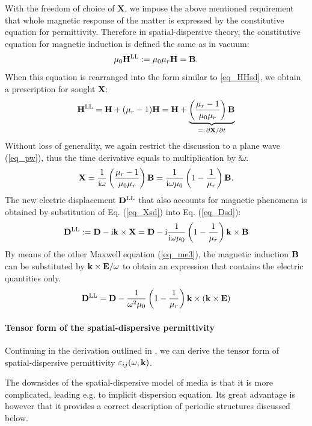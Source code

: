 With the freedom of choice of $\mathbf{X}$, we impose the above mentioned requirement that whole magnetic response of the matter is expressed by the constitutive equation for permittivity. Therefore in spatial-dispersive theory, the constitutive equation %
for magnetic induction is defined the same as in vacuum:
\begin{equation} \mu_0 {\mathbf{H}^\text{LL}} := \mu_0 \mu_r \mathbf{H} = \mathbf{B}. \label{eq_mu_sd}\end{equation}
When this equation is rearranged into the form similar to \ref{eq_HHsd}, we obtain a prescription for sought $\mathbf{X}$: 
$$ {\mathbf{H}^\text{LL}} = \mathbf{H} + (\mu_r -1)\mathbf{H} = \mathbf{H} + \underbrace{\left(\frac{\mu_r-1}{\mu_0\mu_r}\right)\mathbf{B}}_{=:\,\partial\mathbf{X}/\partial t}$$
Without loss of generality, we again restrict the discussion to a plane wave (\ref{eq_pw}), thus the time derivative equals to multiplication by $\ii\omega$.
\begin{equation} \mathbf{X} = \frac{1}{{\mathrm i}\omega}\left(\frac{\mu_r-1}{\mu_0\mu_r}\right)\mathbf{B} = \frac{1}{{\mathrm i}\omega\mu_0}\left(1 - \frac{1}{\mu_r}\right)\mathbf{B}. \label{eq_Xsd}\end{equation}
The new electric displacement ${\mathbf{D}^\text{LL}}$ that also accounts for magnetic phenomena is obtained by substitution of Eq. (\ref{eq_Xsd}) into Eq. (\ref{eq_Dsd}):
\begin{equation} {\mathbf{D}^\text{LL}} := \mathbf{D} - {\mathrm i}{\mathbf{k}}\times \mathbf{X} =  \mathbf{D} - {\mathrm i}  \frac{1}{{\mathrm i}\omega\mu_0}\left(1 - \frac{1}{\mu_r}\right) {\mathbf{k}}\times \mathbf{B}  \label{eq_Dsd2}\end{equation}
By means of the other Maxwell equation (\ref{eq_me3}), the magnetic induction $\mathbf{B}$ can be substituted by ${\mathbf{k}}\times\mathbf{E} / \omega$ to obtain an expression that contains the electric quantities only.
\begin{equation} {\mathbf{D}^\text{LL}} = \mathbf{D} - \frac{1}{\omega^2 \mu_0}\left(1 - \frac{1}{\mu_r}\right) {\mathbf{k}}\times({\mathbf{k}}\times \mathbf{E})  \label{eq_Dsd3}\end{equation}
\paragraph{Tensor form of the spatial-dispersive permittivity}%
Continuing in the derivation outlined in \cite{landau1984electrodynamics, krowne2007book_agran, agranovich2006spatial}, we can derive the tensor form of spatial-dispersive permittivity $\varepsilon_{ij}(\omega,{\mathbf{k}})$.

The downsides of the spatial-dispersive model of media is that it is more complicated, leading e.g. to implicit dispersion equation. Its great advantage is however that it provides a correct description of periodic structures discussed below. 
\mdf{ TODO REF EBD theory and nonlocal electrodynamics %
\cite{krowne2007book_agran}
\cite{landau1984electrodynamics}
\cite{agranovich2006spatial}
\cite{mikki2009electromagnetic}
\cite{vinogradov2002form}
\cite{golubkov1995boundary}
\cite{agranovich2004linear}
\cite{agranovich1962crystal}
}
